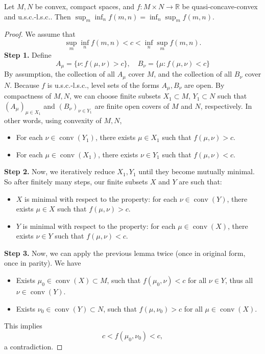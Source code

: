 \begin{theorem}
    Let $M, N$ be convex, compact spaces, and $f: M \times N \to \mathbb{R}$ be quasi-concave-convex and u.s.c.-l.s.c.. Then $\sup_m \inf_n f(m, n) = \inf_n \sup_m f(m, n)$.
\end{theorem}
\begin{proof}
    We assume that 
    \[
        \sup_m \inf_n f(m, n) < c < \inf_n \sup_m f(m, n).  
    \]
    \textbf{Step 1.} Define
    \[
        A_\mu = \{\nu: f(\mu, \nu) > c\}, \quad
        B_\nu = \{\mu: f(\mu, \nu) < c\}
    \]
    By assumption, the collection of all $A_\mu$ cover $M$, and the collection of all $B_\nu$ cover $N$. Because $f$ is u.s.c.-l.s.c., level sets of the forms $A_\mu, B_\nu$ are open.
    By compactness of $M, N$, we can choose finite subsets $X_1 \subset M$, $Y_1 \subset N$ such that $(A_\mu)_{\mu \in X_1}$ and $(B_\nu)_{\nu \in Y_1}$ are finite open covers of $M$ and $N$, respectively.
    In other words, using convexity of $M, N$, 
    \begin{itemize}
        \item For each $\nu \in \operatorname{conv}(Y_1)$, there exists $\mu \in X_1$ such that $f(\mu, \nu) > c$.
        \item For each $\mu \in \operatorname{conv}(X_1)$, there exists $\nu \in Y_1$ such that $f(\mu, \nu) < c$.
    \end{itemize}

    \textbf{Step 2.} Now, we iteratively reduce $X_1, Y_1$ until they become mutually minimal. So after finitely many steps, our finite subsets $X$ and $Y$ are such that:
    \begin{itemize}
        \item $X$ is minimal with respect to the property: for each $\nu \in \operatorname{conv}(Y)$, there exists $\mu \in X$ such that $f(\mu, \nu) > c$.
        \item $Y$ is minimal with respect to the property: for each $\mu \in \operatorname{conv}(X)$, there exists $\nu \in Y$ such that $f(\mu, \nu) < c$.
    \end{itemize}

    \textbf{Step 3.} Now, we can apply the previous lemma twice (once in original form, once in parity). We have
    \begin{itemize}
        \item Exists $\mu_0 \in \operatorname{conv}(X)\subset M$, such that $f(\mu_0, \nu) < c$ for all $\nu \in Y$, thus all $\nu \in \operatorname{conv}(Y)$.
        \item Exists $\nu_0 \in \operatorname{conv}(Y) \subset N$, such that $f(\mu, \nu_0) > c$ for all $\mu \in \operatorname{conv}(X)$.
    \end{itemize}
    This implies
    \[
        c < f(\mu_0, \nu_0) < c,
    \]
    a contradiction.
\end{proof}

